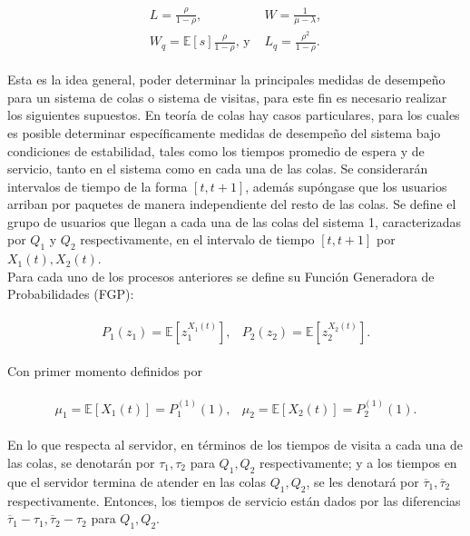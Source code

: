 \documentclass{article}
\newcommand{\esp}{\mathbb{E}}
\numberwithin{equation}{section}
\begin{document}
\begin{eqnarray}
\begin{array}{ll}
 L=\frac{\rho}{1-\rho},& W=\frac{1}{\mu-\lambda},\\
W_{q}=\esp\left[s\right]\frac{\rho}{1-\rho}\textrm{,  y }&  L_{q}=\frac{\rho^{2}}{1-\rho}.
\end{array}
\end{eqnarray}

Esta es la idea general, poder determinar la principales medidas de desempe\~no para un sistema de colas o sistema de visitas, para este fin es necesario realizar los siguientes supuestos. En teor\'ia de colas hay casos particulares, para los cuales es posible determinar espec\'ificamente medidas de desempe\~no del sistema bajo condiciones de estabilidad, tales como los tiempos promedio de espera y de servicio, tanto en el sistema como en cada una de las colas. Se considerar\'an intervalos de tiempo de la forma $\left[t,t+1\right]$, adem\'as sup\'ongase que los usuarios arriban por paquetes de manera independiente del resto de las colas. Se define el grupo de usuarios que llegan a cada una de las colas del sistema 1, caracterizadas por $Q_{1}$ y $Q_{2}$ respectivamente, en el intervalo de tiempo $\left[t,t+1\right]$ por $X_{1}\left(t\right),X_{2}\left(t\right)$.\\

Para cada uno de los procesos anteriores se define su Funci\'on Generadora de Probabilidades (FGP):

\begin{eqnarray}
\begin{array}{cc}
P_{1}\left(z_{1}\right)=\esp\left[z_{1}^{X_{1}\left(t\right)}\right], & P_{2}\left(z_{2}\right)=\esp\left[z_{2}^{X_{2}\left(t\right)}\right].
\end{array}
\end{eqnarray}

Con primer momento definidos por

\begin{eqnarray}
\begin{array}{ll}
\mu_{1}=\esp\left[X_{1}\left(t\right)\right]=P_{1}^{(1)}\left(1\right),& \mu_{2}=\esp\left[X_{2}\left(t\right)\right]=P_{2}^{(1)}\left(1\right).
\end{array}
\end{eqnarray}

En lo que respecta al servidor, en t\'erminos de los tiempos de visita a cada una de las colas, se denotar\'an por $\tau_{1},\tau_{2}$ para $Q_{1},Q_{2}$ respectivamente; y a los tiempos en que el servidor termina de atender en las colas $Q_{1},Q_{2}$, se les denotar\'a por $\overline{\tau}_{1},\overline{\tau}_{2}$ respectivamente. Entonces, los tiempos de servicio est\'an dados por las diferencias $\overline{\tau}_{1}-\tau_{1},\overline{\tau}_{2}-\tau_{2}$ para $Q_{1},Q_{2}$. \\
\end{document}
